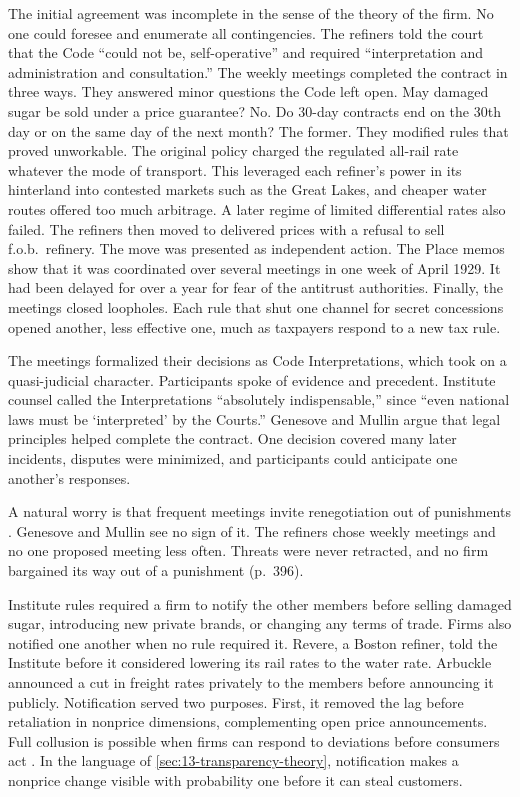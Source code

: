 The initial agreement was incomplete in the sense of the theory of the firm. No one could foresee and enumerate
all contingencies. The refiners told the court that the Code ``could not be, self-operative'' and required
``interpretation and administration and consultation.'' The weekly meetings completed the contract in three ways.
They answered minor questions the Code left open. May damaged sugar be sold under a price guarantee? No. Do
30-day contracts end on the 30th day or on the same day of the next month? The former. They modified rules that
proved unworkable. The original policy charged the regulated all-rail rate whatever the mode of transport. This
leveraged each refiner's power in its hinterland into contested markets such as the Great Lakes, and cheaper water
routes offered too much arbitrage. A later regime of limited differential rates also failed. The refiners then
moved to delivered prices with a refusal to sell f.o.b.\ refinery. The move was presented as independent action.
The Place memos show that it was coordinated over several meetings in one week of April 1929. It had been delayed
for over a year for fear of the antitrust authorities. Finally, the meetings closed loopholes. Each rule that shut
one channel for secret concessions opened another, less effective one, much as taxpayers respond to a new tax
rule.

The meetings formalized their decisions as Code Interpretations, which took on a quasi-judicial character.
Participants spoke of evidence and precedent. Institute counsel called the Interpretations ``absolutely
indispensable,'' since ``even national laws must be `interpreted' by the Courts.'' Genesove and Mullin argue that
legal principles helped complete the contract. One decision covered many later incidents, disputes were
minimized, and participants could anticipate one another's responses.

A natural worry is that frequent meetings invite renegotiation out of punishments \citep{McCutcheon1997}.
Genesove and Mullin see no sign of it. The refiners chose weekly meetings and no one proposed meeting less often.
Threats were never retracted, and no firm bargained its way out of a punishment (p.~396).

Institute rules required a firm to notify the other members before selling damaged sugar, introducing new private
brands, or changing any terms of trade. Firms also notified one another when no rule required it. Revere, a Boston
refiner, told the Institute before it considered lowering its rail rates to the water rate. Arbuckle announced a
cut in freight rates privately to the members before announcing it publicly. Notification served two purposes.
First, it removed the lag before retaliation in nonprice dimensions, complementing open price announcements. Full
collusion is possible when firms can respond to deviations before consumers act \citep{Bhaskar1989}. In the
language of \cref{sec:13-transparency-theory}, notification makes a nonprice change visible with probability one
before it can steal customers.

